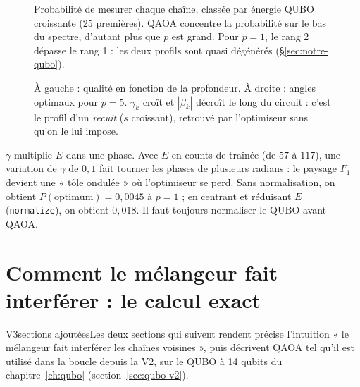 \begin{figure}[htbp]
\centering

\caption{Probabilité de mesurer chaque chaîne, classée par énergie QUBO croissante (25 premières). QAOA concentre la probabilité sur le bas du spectre, d'autant plus que $p$ est grand. Pour $p=1$, le rang 2 dépasse le rang 1 : les deux profils sont quasi dégénérés (§\ref{sec:notre-qubo}).}\label{fig:qaoa-rang}
\end{figure}

\begin{figure}[htbp]
\centering
\begin{minipage}{0.49\linewidth}\centering\end{minipage}\hfill
\begin{minipage}{0.49\linewidth}\centering\end{minipage}
\caption{À gauche : qualité en fonction de la profondeur. À droite : angles optimaux pour $p=5$. $\gamma_k$ croît et $|\beta_k|$ décroît le long du circuit : c'est le profil d'un \emph{recuit} ($s$ croissant), retrouvé par l'optimiseur sans qu'on le lui impose.}\label{fig:qaoa-p}
\end{figure}

\begin{piege}
$\gamma$ multiplie $E$ dans une phase. Avec $E$ en counts de traînée (de $57$ à $117$), une variation de $\gamma$ de $0{,}1$ fait tourner les phases de plusieurs radians : le paysage $F_1$ devient une « tôle ondulée » où l'optimiseur se perd. Sans normalisation, on obtient $P(\text{optimum})=0{,}0045$ à $p=1$ ; en centrant et réduisant $E$ (\texttt{normalize}), on obtient $0{,}018$. Il faut toujours normaliser le QUBO avant QAOA.
\end{piege}

\section{Comment le mélangeur fait interférer : le calcul exact}\label{sec:interference}
\begin{evolution}{V3}{sections ajoutées}Les deux sections qui suivent rendent précise l'intuition « le mélangeur fait interférer les chaînes voisines », puis décrivent QAOA tel qu'il est utilisé dans la boucle depuis la V2, sur le QUBO à 14 qubits du chapitre~\ref{ch:qubo} (section~\ref{sec:qubo-v2}).\end{evolution}

